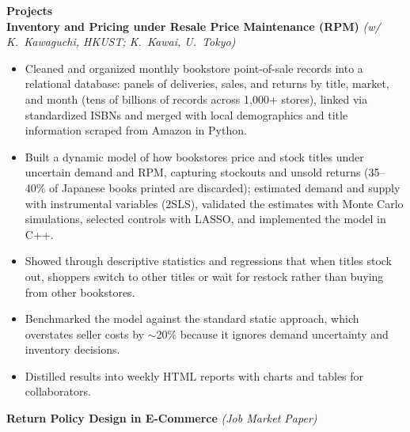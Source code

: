 \documentclass[11pt,letterpaper]{article}
\begin{document}
{\large \textbf{Projects}}\\[-0.5pt]
\textbf{Inventory and Pricing under Resale Price Maintenance (RPM)} \textit{(w/ K.\ Kawaguchi, HKUST; K.\ Kawai, U.\ Tokyo)}\\
\vspace{-6pt}
\begin{itemize}
  \item Cleaned and organized monthly bookstore point-of-sale records into a relational database: panels of deliveries, sales, and returns by title, market, and month (tens of billions of records across 1{,}000+ stores), linked via standardized ISBNs and merged with local demographics and title information scraped from Amazon in Python.
  \item Built a dynamic model of how bookstores price and stock titles under uncertain demand and RPM, capturing stockouts and unsold returns (35--40\% of Japanese books printed are discarded); estimated demand and supply with instrumental variables (2SLS), validated the estimates with Monte Carlo simulations, selected controls with LASSO, and implemented the model in C++.
  \item Showed through descriptive statistics and regressions that when titles stock out, shoppers switch to other titles or wait for restock rather than buying from other bookstores.
  \item Benchmarked the model against the standard static approach, which overstates seller costs by \(\sim\)20\% because it ignores demand uncertainty and inventory decisions.
  \item Distilled results into weekly HTML reports with charts and tables for collaborators.
\end{itemize}
\vspace{-3pt}
\textbf{Return Policy Design in E-Commerce} \textit{(Job Market Paper)}\\
\vspace{-6pt}
\end{document}

